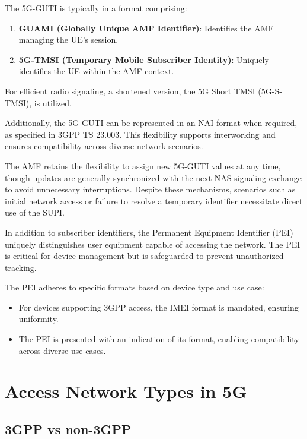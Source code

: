 
The 5G-GUTI is typically in a format comprising:

\begin{enumerate}
    \item {
        \textbf{GUAMI (Globally Unique AMF Identifier)}: Identifies the \ac{AMF} managing the UE's session.
    }
    \item {
        \textbf{5G-TMSI (Temporary Mobile Subscriber Identity)}: Uniquely identifies the UE within the \ac{AMF} context.
    }
\end{enumerate}

For efficient radio signaling, a shortened version, the 5G Short TMSI (5G-S-TMSI), is utilized.

Additionally, the 5G-GUTI can be represented in an NAI format when required, as specified in \ac{3GPP} TS 23.003. This flexibility supports interworking and ensures compatibility across diverse network scenarios.

The \ac{AMF} retains the flexibility to assign new 5G-GUTI values at any time, though updates are generally synchronized with the next \ac{NAS} signaling exchange to avoid unnecessary interruptions. Despite these mechanisms, scenarios such as initial network access or failure to resolve a temporary identifier necessitate direct use of the SUPI.

In addition to subscriber identifiers, the Permanent Equipment Identifier (PEI) uniquely distinguishes user equipment capable of accessing the network. The PEI is critical for device management but is safeguarded to prevent unauthorized tracking.

The PEI adheres to specific formats based on device type and use case:
\begin{itemize}
    \item {
        For devices supporting 3GPP access, the IMEI format is mandated, ensuring uniformity.
    }
    \item {
        The PEI is presented with an indication of its format, enabling compatibility across diverse use cases.
    }
\end{itemize}

\section{Access Network Types in 5G}

\subsection{3GPP vs non-3GPP}


